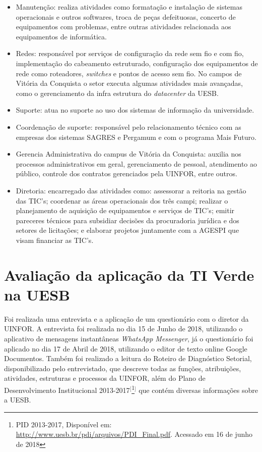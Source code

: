 \begin{itemize}
    \item Manutenção: realiza atividades como formatação e instalação de sistemas operacionais e outros softwares, troca de peças defeituosas, concerto de equipamentos com problemas, entre outras atividades relacionada aos equipamentos de informática.
    \item Redes: responsável por serviços de configuração da rede sem fio e com fio, implementação do cabeamento estruturado, configuração dos equipamentos de rede como roteadores, \textit{switches} e pontos de acesso sem fio. No campos de Vitória da Conquista o setor executa algumas atividades mais avançadas, como o gerenciamento da infra estrutura do \textit{datacenter} da UESB. 
    \item Suporte: atua no suporte ao uso dos sistemas de informação da universidade.
    \item Coordenação de suporte: responsável pelo relacionamento técnico com as empresas dos sistemas SAGRES e Pergamum e com o programa Mais Futuro.
    \item Gerencia Administrativa do campus de Vitória da Conquista: auxilia nos processos administrativos em geral, gerenciamento de pessoal, atendimento ao público, controle dos contratos gerenciados pela UINFOR, entre outros.
    \item Diretoria: encarregado das atividades como: assessorar a reitoria na gestão das TIC's; coordenar as áreas operacionais dos três campi; realizar o planejamento de aquisição de equipamentos e serviços de TIC's; emitir pareceres técnicos para subsidiar decisões da procuradoria jurídica e dos setores de licitações; e elaborar projetos juntamente com a AGESPI que visam financiar as TIC's.
\end{itemize}

\section{Avaliação da aplicação da TI Verde na UESB}

Foi realizada uma entrevista e a aplicação de um questionário com o diretor da UINFOR. A entrevista foi realizada no dia 15 de Junho de 2018, utilizando o aplicativo de mensagens instantâneas \textit{WhatsApp Messenger}, já o questionário foi aplicado no dia 17 de Abril de 2018, utilizando o editor de texto online Google Documentos. Também foi realizado a leitura do Roteiro de Diagnóstico Setorial, disponibilizado pelo entrevistado, que descreve todas as funções, atribuições, atividades, estruturas e processos da UINFOR, além do Plano de Desenvolvimento Institucional 2013-2017$^{[}$\footnote{PID 2013-2017, Disponível em: \url{http://www.uesb.br/pdi/arquivos/PDI_Final.pdf}.  Acessado em 16 de junho de 2018}$^{]}$ que contém diversas informações sobre a UESB.

